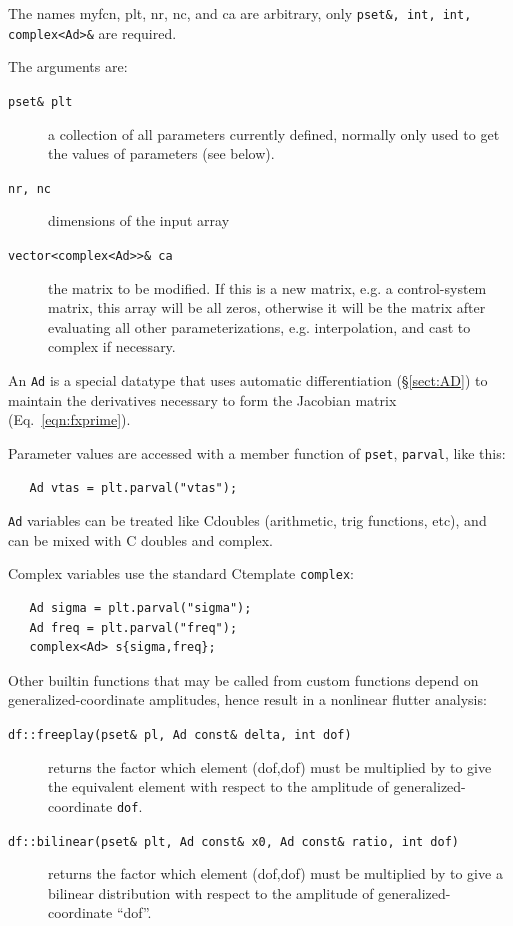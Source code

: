\documentclass[11pt,openany,twoside]{book}
\numberwithin{equation}{section}		%
\def\Cpp{{C\nolinebreak[4]\hspace{-.05em}\raisebox{.4ex}{\tiny\bf ++}}\:}
\newcommand{\Code}[1]{{\small\tt #1}}
\newcommand{\Subst}[1]{{\small\sf #1}}
\newcommand{\Sectref}[1]{\S\ref{#1}}
\newcommand{\Eqn}[1]{Eq.\ \ref{#1}}  %
\begin{document}
The names \Subst{myfcn, plt, nr, nc}, and \Subst{ca} are arbitrary, only
\Code{pset\&, int, int, complex<Ad>\&} are required.

The arguments are:
\begin{description}
\item[\Code{pset\& plt}] a collection of all parameters currently defined, normally
   only used to get the values of parameters (see below).
\item[\Code{nr, nc}] dimensions of the input array
\item[\Code{vector<complex<Ad>>\& ca}] the matrix to be modified. If this is a
new matrix, e.g. a control-system matrix, this array will be all zeros,
otherwise it will be the matrix after evaluating all other parameterizations,
e.g. interpolation, and cast to complex if necessary.
\end{description}
An \Code{Ad} is a special datatype that uses automatic differentiation
(\Sectref{sect:AD}) to maintain the derivatives necessary to form the
Jacobian matrix (\Eqn{eqn:fxprime}).
\index{Ad@\Code{Ad} datatype}
\par
Parameter values are accessed with a member function of \Code{pset}, \Code{parval},
like this:
\begin{lstlisting}
   Ad vtas = plt.parval("vtas");
\end{lstlisting}
\Code{Ad} variables can be treated like \Cpp doubles
(arithmetic, trig functions, etc), and can be mixed with \Cpp
doubles and complex.

Complex variables use the standard \Cpp template \Code{complex}:
\begin{lstlisting}
   Ad sigma = plt.parval("sigma");
   Ad freq = plt.parval("freq");
   complex<Ad> s{sigma,freq};
\end{lstlisting}

Other builtin functions that may be called
from custom functions depend on generalized-coordinate amplitudes,
hence result in a nonlinear flutter analysis:
\begin{description}
\item[\Code{df::freeplay(pset\& pl, Ad const\& delta, int dof)}]
   returns the factor which element (dof,dof) must be multiplied by to give
   the equivalent element with respect to the amplitude of
	generalized-coordinate \Code{dof}.
\item[\Code{df::bilinear(pset\& plt, Ad const\& x0, Ad const\& ratio, int dof)}]
returns the factor which element (dof,dof) must be multiplied by to give
a bilinear distribution with respect to the amplitude of generalized-coordinate
``dof''.
\end{description}
\end{document}
